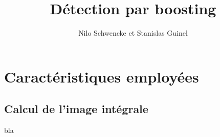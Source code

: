 \documentclass[10pt,a4paper]{article}
\author{Nilo Schwencke et Stanislas Guinel}
\title{Détection par boosting}
\begin{document}
\maketitle

\section{Caract\'eristiques employ\'ees}
\subsection{Calcul de l'image int\'egrale}

bla
\end{document}
